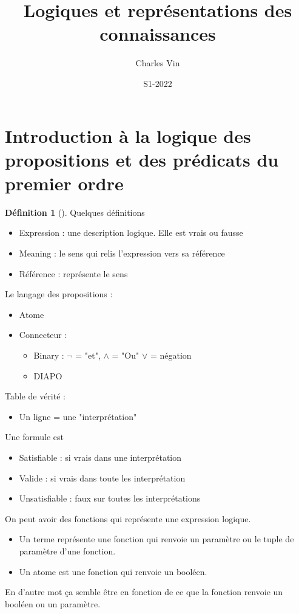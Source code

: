 \documentclass{article}
\title{Logiques et représentations des connaissances}
\author{Charles Vin}
\date{S1-2022}
\theoremstyle{plain}%
\theoremstyle{definition}
\newtheorem{defn}{Définition}[section]
\theoremstyle{remark}
\begin{document}
\maketitle

\section{Introduction à la logique des propositions et des prédicats du premier ordre}
\begin{defn}[]
    Quelques définitions
    \begin{itemize}
        \item Expression : une description logique. Elle est vrais ou fausse
        \item Meaning : le sens qui relis l'expression vers sa référence
        \item Référence : représente le sens
    \end{itemize}

    Le langage des propositions : 
    \begin{itemize}
        \item Atome 
        \item Connecteur : \begin{itemize}
            \item Binary : $ \neg $ = "et", $\wedge$ = "Ou" $\vee$ = négation 
            \item DIAPO
        \end{itemize}
    \end{itemize}

    Table de vérité : \begin{itemize}
        \item Un ligne = une "interprétation"
    \end{itemize}

    Une formule est \begin{itemize}
        \item Satisfiable : si vrais dans une interprétation
        \item Valide : si vrais dans toute les interprétation
        \item Unsatisfiable : faux sur toutes les interprétations
    \end{itemize}

    On peut avoir des fonctions qui représente une expression logique. \begin{itemize}
        \item Un terme représente une fonction qui renvoie un paramètre ou le tuple de paramètre d'une fonction.
        \item Un atome est une fonction qui renvoie un booléen.
    \end{itemize}
    En d'autre mot ça semble être en fonction de ce que la fonction renvoie un booléen ou un paramètre.
    

\end{defn}
\end{document}
